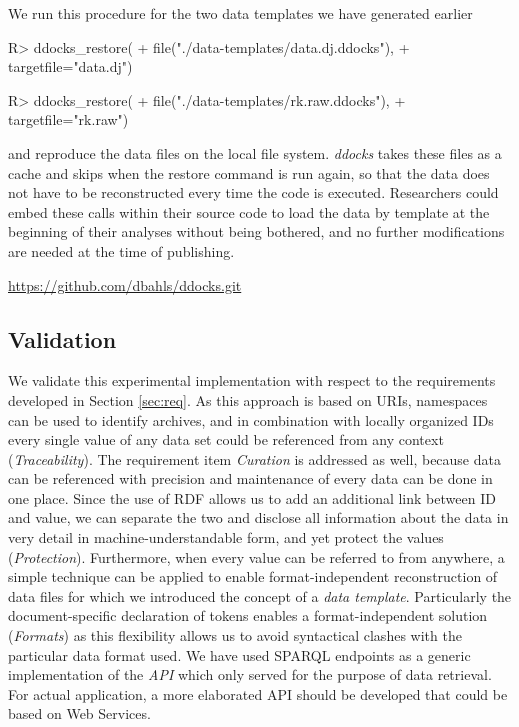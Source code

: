 \documentclass{acm_proc_article-sp}
\begin{document}
We run this procedure for the two data templates we have generated earlier
\begin{Schunk}
\begin{Sinput}
R> ddocks_restore(
+    file("./data-templates/data.dj.ddocks"), 
+    targetfile="data.dj")
\end{Sinput}
\end{Schunk}

\begin{Schunk}
\begin{Sinput}
R> ddocks_restore(
+    file("./data-templates/rk.raw.ddocks"), 
+    targetfile="rk.raw")
\end{Sinput}
\end{Schunk}
and reproduce the data files on the local file system.
\textit{ddocks} takes these files as a cache and skips when the restore command is run again, so that the data does not have to be reconstructed every time the code is executed.
Researchers could embed these calls within their source code to load the data by template at the beginning of their analyses without being bothered, and no further modifications are needed at the time of publishing.


%
%
\url{https://github.com/dbahls/ddocks.git}




\subsection{Validation}


We validate this experimental implementation with respect to the requirements developed in Section \ref{sec:req}.
As this approach is based on URIs, namespaces can be used to identify archives, and in combination with locally organized IDs every single value of any data set could be referenced from any context (\textit{Traceability}).
The requirement item \textit{Curation} is addressed as well, because data can be referenced with precision and maintenance of every data can be done in one place. 
Since the use of RDF allows us to add an additional link between ID and value, we can separate the two and disclose all information about the data in very detail in machine-understandable form, and yet protect the values (\textit{Protection}).
Furthermore, when every value can be referred to from anywhere, a simple technique can be applied to enable format-independent reconstruction of data files for which we introduced the concept of a \textit{data template}.
Particularly the document-specific declaration of tokens enables a format-independent solution (\textit{Formats}) as this flexibility allows us to avoid syntactical clashes with the particular data format used.
We have used SPARQL endpoints as a generic implementation of the \textit{API} which only served for the purpose of data retrieval.
For actual application, a more elaborated API should be developed that could be based on Web Services.
\end{document}
